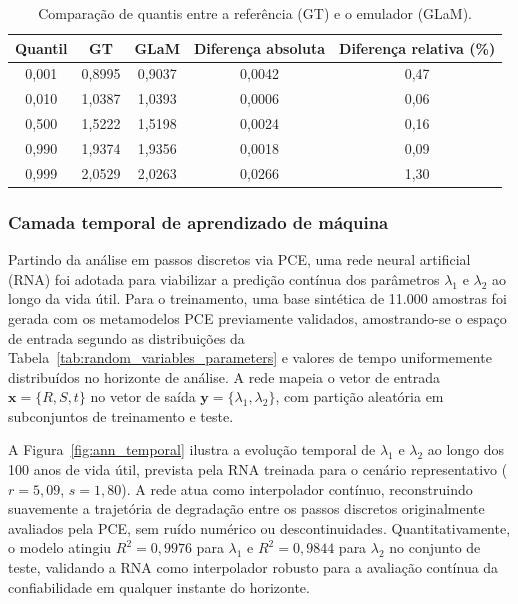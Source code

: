 \begin{table}[H]
\centering
\caption{Comparação de quantis entre a referência (GT) e o emulador (GLaM).}
\label{tab:quantile_comparison}
\begin{tabular}{ccccc}
\hline
Quantil & GT & GLaM & Diferença absoluta & Diferença relativa (\%) \\
\hline
0,001 & 0,8995 & 0,9037 & 0,0042 & 0,47 \\
0,010 & 1,0387 & 1,0393 & 0,0006 & 0,06 \\
0,500 & 1,5222 & 1,5198 & 0,0024 & 0,16 \\
0,990 & 1,9374 & 1,9356 & 0,0018 & 0,09 \\
0,999 & 2,0529 & 2,0263 & 0,0266 & 1,30 \\
\hline
\end{tabular}
\end{table}


\subsubsection{Camada temporal de aprendizado de máquina}

Partindo da análise em passos discretos via PCE, uma rede neural artificial (RNA) foi adotada para viabilizar a predição contínua dos parâmetros $\lambda_1$ e $\lambda_2$ ao longo da vida útil. Para o treinamento, uma base sintética de 11.000 amostras foi gerada com os metamodelos PCE previamente validados, amostrando-se o espaço de entrada segundo as distribuições da Tabela~\ref{tab:random_variables_parameters} e valores de tempo uniformemente distribuídos no horizonte de análise. A rede mapeia o vetor de entrada $\mathbf{x} = \{R, S, t\}$ no vetor de saída $\mathbf{y} = \{\lambda_1, \lambda_2\}$, com partição aleatória em subconjuntos de treinamento e teste.

A Figura~\ref{fig:ann_temporal} ilustra a evolução temporal de $\lambda_1$ e $\lambda_2$ ao longo dos 100 anos de vida útil, prevista pela RNA treinada para o cenário representativo ($r=5{,}09$, $s=1{,}80$). A rede atua como interpolador contínuo, reconstruindo suavemente a trajetória de degradação entre os passos discretos originalmente avaliados pela PCE, sem ruído numérico ou descontinuidades. Quantitativamente, o modelo atingiu $R^2 = 0{,}9976$ para $\lambda_1$ e $R^2 = 0{,}9844$ para $\lambda_2$ no conjunto de teste, validando a RNA como interpolador robusto para a avaliação contínua da confiabilidade em qualquer instante do horizonte. 

